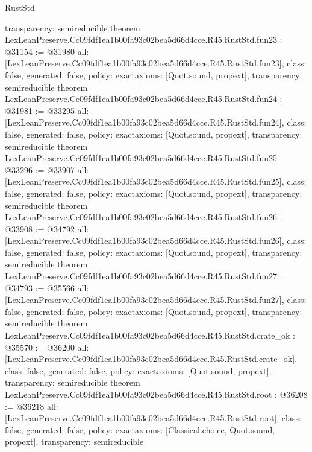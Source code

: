\begin{lexlean}{RustStd}
\begin{coremodule}
{  transparency: semireducible
}
theorem LexLeanPreserve.Cc09fdf1ea1b00fa93c02bea5d66d4cce.R45.RustStd.fun23 : @31154 := @31980 {
  all: [LexLeanPreserve.Cc09fdf1ea1b00fa93c02bea5d66d4cce.R45.RustStd.fun23],
  class: false,
  generated: false,
  policy: exact{axioms: [Quot.sound, propext]},
  transparency: semireducible
}
theorem LexLeanPreserve.Cc09fdf1ea1b00fa93c02bea5d66d4cce.R45.RustStd.fun24 : @31981 := @33295 {
  all: [LexLeanPreserve.Cc09fdf1ea1b00fa93c02bea5d66d4cce.R45.RustStd.fun24],
  class: false,
  generated: false,
  policy: exact{axioms: [Quot.sound, propext]},
  transparency: semireducible
}
theorem LexLeanPreserve.Cc09fdf1ea1b00fa93c02bea5d66d4cce.R45.RustStd.fun25 : @33296 := @33907 {
  all: [LexLeanPreserve.Cc09fdf1ea1b00fa93c02bea5d66d4cce.R45.RustStd.fun25],
  class: false,
  generated: false,
  policy: exact{axioms: [Quot.sound, propext]},
  transparency: semireducible
}
theorem LexLeanPreserve.Cc09fdf1ea1b00fa93c02bea5d66d4cce.R45.RustStd.fun26 : @33908 := @34792 {
  all: [LexLeanPreserve.Cc09fdf1ea1b00fa93c02bea5d66d4cce.R45.RustStd.fun26],
  class: false,
  generated: false,
  policy: exact{axioms: [Quot.sound, propext]},
  transparency: semireducible
}
theorem LexLeanPreserve.Cc09fdf1ea1b00fa93c02bea5d66d4cce.R45.RustStd.fun27 : @34793 := @35566 {
  all: [LexLeanPreserve.Cc09fdf1ea1b00fa93c02bea5d66d4cce.R45.RustStd.fun27],
  class: false,
  generated: false,
  policy: exact{axioms: [Quot.sound, propext]},
  transparency: semireducible
}
theorem LexLeanPreserve.Cc09fdf1ea1b00fa93c02bea5d66d4cce.R45.RustStd.crate_ok : @35570 := @36200 {
  all: [LexLeanPreserve.Cc09fdf1ea1b00fa93c02bea5d66d4cce.R45.RustStd.crate_ok],
  class: false,
  generated: false,
  policy: exact{axioms: [Quot.sound, propext]},
  transparency: semireducible
}
theorem LexLeanPreserve.Cc09fdf1ea1b00fa93c02bea5d66d4cce.R45.RustStd.root : @36208 := @36218 {
  all: [LexLeanPreserve.Cc09fdf1ea1b00fa93c02bea5d66d4cce.R45.RustStd.root],
  class: false,
  generated: false,
  policy: exact{axioms: [Classical.choice, Quot.sound, propext]},
  transparency: semireducible
}


\end{coremodule}
\end{lexlean}
